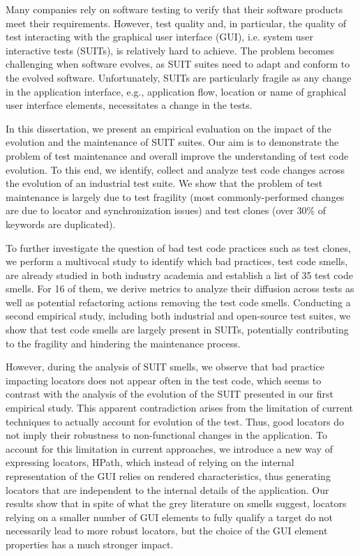 Many companies rely on software testing to verify that their software products meet their requirements. However, test quality and, in particular, the quality of test interacting with the graphical user interface (GUI), i.e. system user interactive tests (SUITs), is relatively hard to achieve. The problem becomes challenging when software evolves, as SUIT suites need to adapt and conform to the evolved software. Unfortunately, SUITs are particularly fragile as any change in the application interface, e.g., application flow, location or name of graphical user interface elements, necessitates a change in the tests. 

In this dissertation, we present an empirical evaluation on the impact of the evolution and the maintenance of SUIT suites. Our aim is to demonstrate the problem of test maintenance and overall improve the understanding of test code evolution. To this end, we identify, collect and analyze test code changes across the evolution of an industrial test suite. We show that the problem of test maintenance is largely due to test fragility (most commonly-performed changes are due to locator and synchronization issues) and test clones (over 30\% of keywords are duplicated). 

To further investigate the question of bad test code practices such as test clones, we perform a multivocal study to identify which bad practices, test code smells, are already studied in both industry academia and establish a list of 35 test code smells. For 16 of them, we derive metrics to analyze their diffusion across tests as well as potential refactoring actions removing the test code smells. Conducting a second empirical study, including both industrial and open-source test suites, we show that test code smells are largely present in SUITs, potentially contributing to the fragility and hindering the maintenance process.

However, during the analysis of SUIT smells, we observe that bad practice impacting locators does not appear often in the test code, which seems to contrast with the analysis of the evolution of the SUIT presented in our first empirical study.  This apparent contradiction arises from the limitation of current techniques to actually account for evolution of the test. Thus, good locators do not imply their robustness to non-functional changes in the application. To account for this limitation in current approaches, we introduce a new way of expressing locators, HPath, which instead of relying on the internal representation of the GUI relies on rendered characteristics, thus generating locators that are independent to the internal details of the application. Our results show that in spite of what the grey literature on smells suggest, locators relying on a smaller number of GUI elements to fully qualify a target do not necessarily lead to more robust locators, but the choice of the GUI element properties has a much stronger impact.
